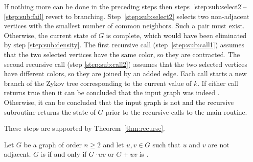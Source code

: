 If nothing more can be done in the preceding steps then steps~\ref{step:sub:select2}--\ref{step:sub:fail} revert to
branching.  Step~\ref{step:sub:select2} selects two non-adjacent vertices with the smallest number of common
neighbors.  Such a pair must exist.  Otherwise, the current state of \(G\) is complete, which would have been
eliminated by step \ref{step:sub:density}.  The first recursive call (step~\ref{step:sub:call1}) assumes that the
two selected vertices have the same color, so they are contracted.  The second recursive call (step
\ref{step:sub:call2}) assumes that the two selected vertices have different colors, so they are joined by an added
edge.  Each call starts a new branch of the Zykov tree corresponding to the current value of \(k\).  If either call
returns true then it can be concluded that the input graph was indeed .  Otherwise, it can be
concluded that the input graph is not  and the recursive subroutine returns the state of \(G\) prior to
the recursive calls to the main routine.

These steps are supported by Theorem~\ref{thm:recurse}.

\begin{theorem}
  \label{thm:recurse}
  Let \(G\) be a graph of order \(n\ge2\) and let \(u,v\in G\) such that \(u\) and \(v\) are not adjacent.  \(G\)
  is  if and only if \(G\cdot uv\) or \(G+uv\) is .
\end{theorem}


